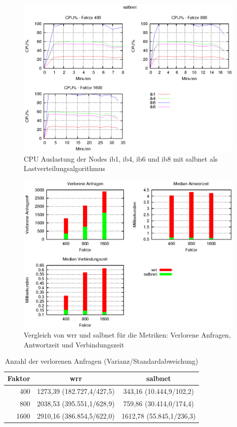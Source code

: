 \documentclass[a4paper, 12pt, BCOR10mm, DIV12, toc=bibliography, toc=listof, german]{scrbook}
\begin{document}
			\begin{figure}
				\centering
				\includegraphics[width=13cm]{plots/cpu-salbnet}
				\caption{CPU Auslastung der Nodes ib1, ib4, ib6 und ib8 mit salbnet als
				Lastverteilungsalgorithmus}
				\label{fig:cpu-salbnet}
			\end{figure}

			\begin{figure}
				\centering
				\includegraphics[width=13cm]{plots/servload}
				\caption{Vergleich von wrr und salbnet für die Metriken: Verlorene Anfragen, Antwortzeit und	Verbindungszeit}
				\label{fig:ergebnis}
			\end{figure}

			\begin{table}
				\centering
				\begin{tabular}{|r|c|c|}\hline
					Faktor & wrr & salbnet \\\hline\hline
					400 & 1273,39 (182.727,4/427,5) & 343,16 (10.444,9/102,2)\\
					800 & 2038,53 (395.551,1/628,9) & 759,86 (30.414,0/174,4)\\
					1600 & 2910,16 (386.854,5/622,0) & 1612,78 (55.845,1/236,3)\\\hline
				\end{tabular}
				\caption{Anzahl der verlorenen Anfragen (Varianz/Standardabweichung)}
				\label{tab:timeout}
			\end{table}
\end{document}
